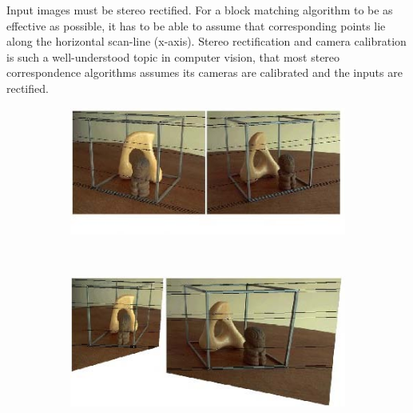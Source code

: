 Input images must be stereo rectified. For a block matching algorithm
to be as effective as possible, it has to be able to assume that
corresponding points lie along the horizontal scan-line
(x-axis). Stereo rectification and camera calibration is such a
well-understood topic in computer vision, that most stereo
correspondence algorithms assumes its cameras are calibrated and the
inputs are rectified. 

\begin{figure}

  \begin{subfigure}[b]{0.48\textwidth}
    \centering
    \includegraphics[width=\textwidth]{images/rectification-example.png}
    \caption{}
  \end{subfigure}
  ~
  \begin{subfigure}[b]{0.48\textwidth}
    \centering
    \includegraphics[width=\textwidth]{images/rectification-example-2.png}
    \caption{}
  \end{subfigure}


\end{figure}
